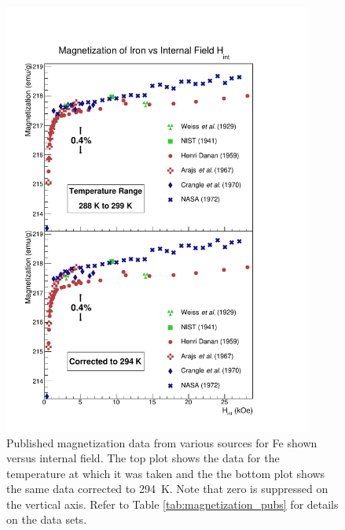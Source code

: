 \documentclass[preprint,12pt]{elsarticle}
\begin{document}
\begin{figure}[ht!]
\centering
\includegraphics[width=0.9\textwidth]{FeMagnetization_vs_Hint.pdf}
\caption{Published magnetization data from various sources for Fe shown versus internal field. The top plot shows the data for the temperature at which it was taken and the the bottom plot shows the same data corrected to 294~K. Note that zero is suppressed on the vertical axis. Refer to Table \ref{tab:magnetization_pubs} for details on the data sets.}
\label{fig:mag_Fe}
\end{figure}
\end{document}
